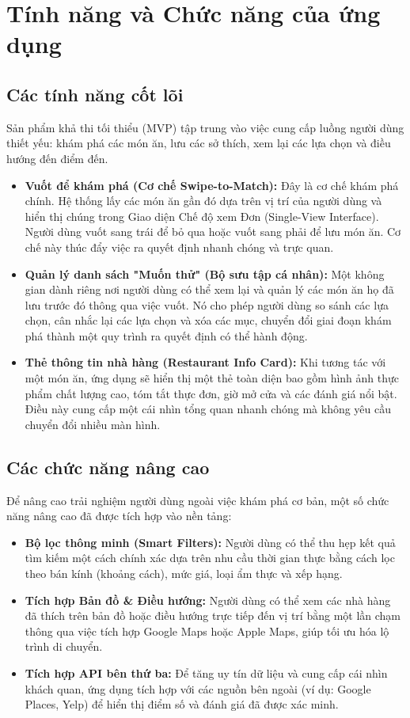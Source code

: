 \section{Tính năng và Chức năng của ứng dụng}
\label{sec:application_features}

\subsection{Các tính năng cốt lõi}
Sản phẩm khả thi tối thiểu (MVP) tập trung vào việc cung cấp luồng người dùng thiết yếu: khám phá các món ăn, lưu các sở thích, xem lại các lựa chọn và điều hướng đến điểm đến.
\begin{itemize}
    \item \textbf{Vuốt để khám phá (Cơ chế Swipe-to-Match):} Đây là cơ chế khám phá chính. Hệ thống lấy các món ăn gần đó dựa trên vị trí của người dùng và hiển thị chúng trong Giao diện Chế độ xem Đơn (Single-View Interface). Người dùng vuốt sang trái để bỏ qua hoặc vuốt sang phải để lưu món ăn. Cơ chế này thúc đẩy việc ra quyết định nhanh chóng và trực quan.
    \item \textbf{Quản lý danh sách "Muốn thử" (Bộ sưu tập cá nhân):} Một không gian dành riêng nơi người dùng có thể xem lại và quản lý các món ăn họ đã lưu trước đó thông qua việc vuốt. Nó cho phép người dùng so sánh các lựa chọn, cân nhắc lại các lựa chọn và xóa các mục, chuyển đổi giai đoạn khám phá thành một quy trình ra quyết định có thể hành động.
    \item \textbf{Thẻ thông tin nhà hàng (Restaurant Info Card):} Khi tương tác với một món ăn, ứng dụng sẽ hiển thị một thẻ toàn diện bao gồm hình ảnh thực phẩm chất lượng cao, tóm tắt thực đơn, giờ mở cửa và các đánh giá nổi bật. Điều này cung cấp một cái nhìn tổng quan nhanh chóng mà không yêu cầu chuyển đổi nhiều màn hình.
\end{itemize}

\subsection{Các chức năng nâng cao}
Để nâng cao trải nghiệm người dùng ngoài việc khám phá cơ bản, một số chức năng nâng cao đã được tích hợp vào nền tảng:
\begin{itemize}
    \item \textbf{Bộ lọc thông minh (Smart Filters):} Người dùng có thể thu hẹp kết quả tìm kiếm một cách chính xác dựa trên nhu cầu thời gian thực bằng cách lọc theo bán kính (khoảng cách), mức giá, loại ẩm thực và xếp hạng.
    \item \textbf{Tích hợp Bản đồ \& Điều hướng:} Người dùng có thể xem các nhà hàng đã thích trên bản đồ hoặc điều hướng trực tiếp đến vị trí bằng một lần chạm thông qua việc tích hợp Google Maps hoặc Apple Maps, giúp tối ưu hóa lộ trình di chuyển.
    \item \textbf{Tích hợp API bên thứ ba:} Để tăng uy tín dữ liệu và cung cấp cái nhìn khách quan, ứng dụng tích hợp với các nguồn bên ngoài (ví dụ: Google Places, Yelp) để hiển thị điểm số và đánh giá đã được xác minh.
\end{itemize}


